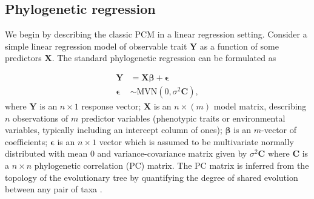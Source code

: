 \documentclass[12pt]{article}
\begin{document}
\newcommand{\bX}{{\mathbf X}}
\newcommand{\bbeta}{{\boldsymbol \beta}}
\newcommand{\bmu}{{\boldsymbol \mu}}
\newcommand{\bY}{{\mathbf Y}}
\newcommand{\bC}{{\mathbf C}}
\newcommand{\bZ}{{\mathbf Z}}
\newcommand{\bb}{{\mathbf b}}
\newcommand{\besp}{{\boldsymbol \epsilon}}
\newcommand{\bSigma}{{\boldsymbol \Sigma}}

\subsection*{Phylogenetic regression}

We begin by describing the classic PCM in a linear regression setting.
Consider a simple linear regression model of observable trait $\bY$ as a function of some predictors $\bX$. 
The standard phylogenetic regression can be formulated as


\begin{equation}
\begin{aligned}
\bY & = \bX \bbeta + \besp  \\
\besp & \sim \textrm{MVN}(0,\sigma^{2} \bC), 
\label{eq:gls}
\end{aligned}
\end{equation}
where $\bY$ is an $n \times 1$ response vector; $\bX$ is an $n \times (m)$ model matrix, describing $n$ observations of $m$ predictor variables (phenotypic traits or environmental variables, typically including an intercept column of ones); $\bbeta$ is an $m$-vector of coefficients; $\besp$ is an $n \times 1$ vector which is assumed to be multivariate normally distributed with mean $0$ and variance-covariance matrix given by $\sigma^{2} \bC$ where $\bC$ is a $n \times n$ phylogenetic correlation (PC) matrix.
The PC matrix is inferred from the topology of the evolutionary tree by quantifying the degree of shared evolution between any pair of taxa \citep{garamszegi2014modern}.


\end{document}
